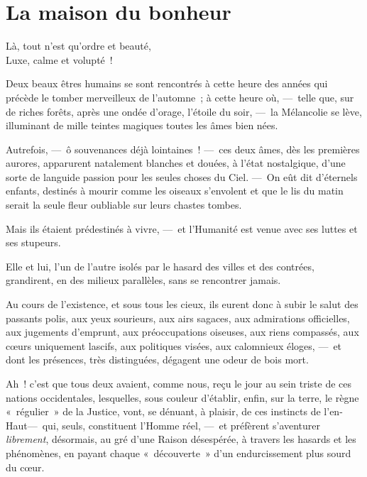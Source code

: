 \documentclass[french,twoside]{book} %
\newcommand{\bibl}[1]{{\RaggedLeft{#1}\par\bigskip}}
\begin{document}
 \section[{La maison du bonheur}]{La maison du bonheur}\renewcommand{\leftmark}{La maison du bonheur}

\noindent Là, tout n’est qu’ordre et beauté, \\
Luxe, calme et volupté !\par

\bibl{({\scshape Charles Baudelaire}. \emph{L’Invitation au voyage}.)}
\noindent Deux beaux êtres humains se sont rencontrés à cette heure des années qui précède le tomber merveilleux de l’automne ; à cette heure où, — telle que, sur de riches forêts, après une ondée d’orage, l’étoile du soir, — la Mélancolie se lève, illuminant de mille teintes magiques toutes les âmes bien nées.\par
Autrefois, — ô souvenances déjà lointaines ! — ces deux âmes, dès les premières aurores, apparurent natalement blanches et douées, à l’état nostalgique, d’une sorte de languide passion   pour les seules choses du Ciel. — On eût dit d’éternels enfants, destinés à mourir comme les oiseaux s’envolent et que le lis du matin serait la seule fleur oubliable sur leurs chastes tombes.\par
Mais ils étaient prédestinés à vivre, — et l’Humanité est venue avec ses luttes et ses stupeurs.\par
Elle et lui, l’un de l’autre isolés par le hasard des villes et des contrées, grandirent, en des milieux parallèles, sans se rencontrer jamais.\par
Au cours de l’existence, et sous tous les cieux, ils eurent donc à subir le salut des passants polis, aux yeux sourieurs, aux airs sagaces, aux admirations officielles, aux jugements d’emprunt, aux préoccupations oiseuses, aux riens compassés, aux cœurs uniquement lascifs, aux politiques visées, aux calomnieux éloges, — et dont les présences, très distinguées, dégagent une odeur de bois mort.\par
Ah ! c’est que tous deux avaient, comme nous, reçu le jour au sein triste de ces nations occidentales, lesquelles, sous couleur d’établir, enfin, sur la terre, le règne « régulier » de la Justice, vont,   se dénuant, à plaisir, de ces instincts de l’en-Haut— qui, seuls, constituent l’Homme réel, — et préfèrent s’aventurer \emph{librement}, désormais, au gré d’une Raison désespérée, à travers les hasards et les phénomènes, en payant chaque « découverte » d’un endurcissement plus sourd du cœur.\par
\end{document}
